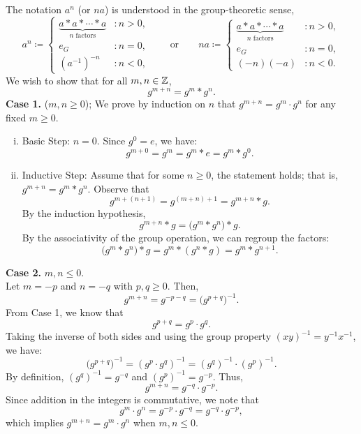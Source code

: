 \documentclass[11pt,openany]{article}
\begin{document}
\begin{remark*}
	The notation \(a^n\) (or $na$) is understood in the group-theoretic sense, \[
	a^n \coloneqq
	\begin{cases}
		\underbrace{a \ast a \ast \cdots \ast a}_{n \text{ factors}} &: n > 0, \\
		e_G &: n = 0, \\
		(a^{-1})^{-n}&: n < 0,
	\end{cases}\quad\quad\text{or}\quad\quad	
na \coloneqq
\begin{cases}
\underbrace{a \ast a \ast \cdots \ast a}_{n \text{ factors}} &: n > 0, \\
e_G &: n = 0, \\
(-n)(-a)&: n < 0.
\end{cases}
\]
We wish to show that for all \(m, n\in\mathbb{Z}\), \[
g^{m+n} = g^m \ast g^n.
\]
\textbf{Case 1.} (\(m,n \ge 0\)); We prove by induction on \(n\) that \(g^{m+n} = g^m \cdot g^n\) for any fixed \(m \ge 0\).
\begin{enumerate}[(i)]
	\item Basic Step: $n=0$. Since \(g^0 = e\), we have: \[
	g^{m+0} = g^m = g^m \ast e = g^m \ast g^0.
	\]
	\item Inductive Step: Assume that for some \(n \ge 0\), the statement holds; that is, $g^{m+n} = g^m \ast g^n$. Observe that \[
	g^{m+(n+1)} = g^{(m+n)+1} = g^{m+n} \ast g.
	\]
	By the induction hypothesis, \[
	g^{m+n} \ast g = \bigl( g^m \ast g^n \bigr) \ast g.
	\]
	By the associativity of the group operation, we can regroup the factors: \[
	\bigl( g^m \ast g^n \bigr) \ast g = g^m \ast (g^n \ast g) = g^m \ast g^{n+1}.
	\]
\end{enumerate}
\textbf{Case 2.} \(m,n \le 0\).\\
Let \(m = -p\) and \(n = -q\) with \(p,q \ge 0\). Then,
\[
g^{m+n} = g^{-p - q} = \bigl( g^{p+q} \bigr)^{-1}.
\]
From Case 1, we know that
\[
g^{p+q} = g^p \cdot g^q.
\]
Taking the inverse of both sides and using the group property \((xy)^{-1} = y^{-1} x^{-1}\), we have:
\[
\bigl( g^{p+q} \bigr)^{-1} = (g^p \cdot g^q)^{-1} = (g^q)^{-1} \cdot (g^p)^{-1}.
\]
By definition, \((g^q)^{-1} = g^{-q}\) and \((g^p)^{-1} = g^{-p}\). Thus,
\[
g^{m+n} = g^{-q} \cdot g^{-p}.
\]
Since addition in the integers is commutative, we note that
\[
g^m \cdot g^n = g^{-p} \cdot g^{-q} = g^{-q} \cdot g^{-p},
\]
which implies \(g^{m+n} = g^m \cdot g^n\) when \(m,n \le 0\).


\end{remark*}
\end{document}
